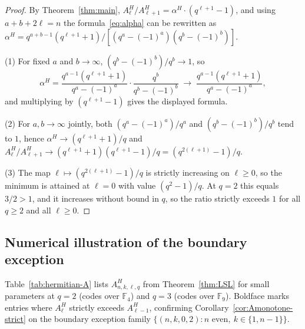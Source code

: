 \documentclass[11pt]{article}
\theoremstyle{plain}
\theoremstyle{remark}
\newcommand{\F}{\mathbb{F}}
\begin{document}
\begin{proof}
By Theorem~\ref{thm:main}, $A^H_\ell/A^H_{\ell+1} = \alpha^H \cdot (q^{\ell+1}-1)$,
and using $a + b + 2\ell = n$ the formula~\eqref{eq:alpha} can be rewritten as
$\alpha^H = q^{a+b-1}(q^{\ell+1}+1)/[(q^a-(-1)^a)(q^b-(-1)^b)]$.

(1) For fixed $a$ and $b \to \infty$, $(q^b - (-1)^b)/q^b \to 1$, so
\[
  \alpha^H
  = \frac{q^{a-1}(q^{\ell+1}+1)}{q^a - (-1)^a} \cdot \frac{q^b}{q^b - (-1)^b}
  \;\longrightarrow\; \frac{q^{a-1}(q^{\ell+1}+1)}{q^a - (-1)^a},
\]
and multiplying by $(q^{\ell+1}-1)$ gives the displayed formula.

(2) For $a, b \to \infty$ jointly, both $(q^a - (-1)^a)/q^a$ and
$(q^b - (-1)^b)/q^b$ tend to $1$, hence
$\alpha^H \to (q^{\ell+1}+1)/q$ and
$A^H_\ell/A^H_{\ell+1} \to (q^{\ell+1}+1)(q^{\ell+1}-1)/q = (q^{2(\ell+1)}-1)/q$.

(3) The map $\ell \mapsto (q^{2(\ell+1)}-1)/q$ is strictly increasing on
$\ell \geq 0$, so the minimum is attained at $\ell = 0$ with value
$(q^2 - 1)/q$. At $q = 2$ this equals $3/2 > 1$, and it increases without
bound in $q$, so the ratio strictly exceeds $1$ for all $q \geq 2$ and all
$\ell \geq 0$.
\end{proof}

\subsection{Numerical illustration of the boundary exception}\label{sec:Hnum}

Table~\ref{tab:hermitian-A} lists $A^H_{n,k,\ell,q}$ from Theorem~\ref{thm:LSL}
for small parameters at $q = 2$ (codes over $\F_4$) and $q = 3$ (codes over
$\F_9$). Boldface marks entries where $A^H_\ell$ strictly exceeds $A^H_{\ell-1}$,
confirming Corollary~\ref{cor:Amonotone-strict} on the boundary exception
family $\{(n, k, 0, 2) : n \text{ even},\ k \in \{1, n-1\}\}$.
\end{document}
